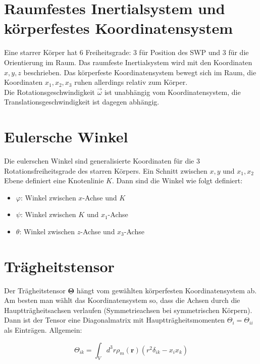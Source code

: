 \section{Raumfestes Inertialsystem und körperfestes Koordinatensystem}

\begin{frameddefn}[a]
	
	Eine starrer Körper hat 6 Freiheitsgrade: 3 für Position des SWP und 3 für die Orientierung im Raum. Das raumfeste Inertialsystem wird mit den Koordinaten $x,y,z$ beschrieben. Das körperfeste Koordinatensystem bewegt sich im Raum, die Koordinaten $x_1, x_2, x_3$ ruhen allerdings relativ zum Körper.\\
	Die Rotationsgeschwindigkeit $\vec{\omega}$ ist unabhängig vom Koordinatensystem, die Translationsgeschwindigkeit ist dagegen abhängig.
	
\end{frameddefn}

\section{Eulersche Winkel}

\begin{frameddefn}
	
	Die eulerschen Winkel sind generalisierte Koordinaten für die 3 Rotationsfreiheitsgrade des starren Körpers. Ein Schnitt zwischen $x,y$ und $x_1,x_2$ Ebene definiert eine Knotenlinie $K$. Dann sind die Winkel wie folgt definiert:
	
	\begin{itemize}
		\item $\varphi$: Winkel zwischen $x$-Achse und $K$
		\item $\psi$: Winkel zwischen $K$ und $x_1$-Achse
		\item $\theta$: Winkel zwischen $z$-Achse und $x_3$-Achse
	\end{itemize}
	
\end{frameddefn}

\newpage
\section{Trägheitstensor}

\begin{frameddefn}[Trägheitstensor]
	
	Der Trägheitstensor $\mathbf{\underline \Theta}$ hängt vom gewählten körperfesten Koordinatensystem ab. Am besten man wählt das Koordinatensystem so, dass die Achsen durch die Hauptträgheitsachsen verlaufen (Symmetrieachsen bei symmetrischen Körpern). Dann ist der Tensor eine Diagonalmatrix mit Hauptträgheitsmomenten $\Theta_i = \Theta_{ii}$ als Einträgen. Allgemein:
	
	\[ \Theta_{ik} = \int_V d^3r \rho_m(\mathbf{r}) (r^2 \delta_{ik} - x_i x_k) \]
	
\end{frameddefn}

